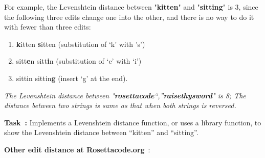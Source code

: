 For example, the Levenshtein distance between "\textbf{kitten}" and
"\textbf{sitting}" is 3, since the following three edits change one into
the other, and there is no way to do it with fewer than three edits:

\begin{enumerate}
\item
  \textbf{k}itten \textbf{s}itten (substitution of `k' with 's')
\item
  sitt\textbf{e}n sitt\textbf{i}n (substitution of `e' with `i')
\item
  sittin sittin\textbf{g} (insert `g' at the end).
\end{enumerate}

\emph{The Levenshtein distance between
  "\textbf{rosettacode}``,''\textbf{raisethysword}" is 8; The distance
  between two strings is same as that when both strings is reversed.}

\textbf{Task~:} Implements a Levenshtein distance function, or uses a
library function, to show the Levenshtein distance between ``kitten''
and ``sitting''.

\textbf{Other edit distance at Rosettacode.org}~:

